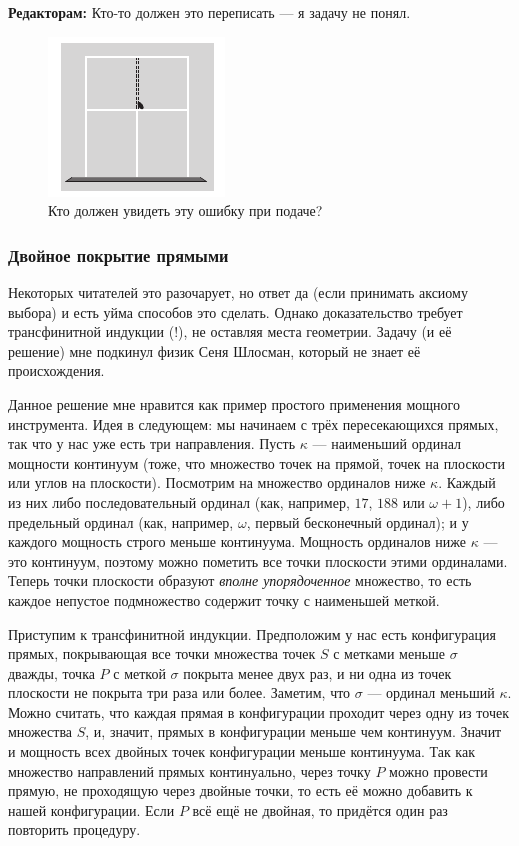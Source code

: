 \begin{addedbytheeditors}
\textbf{Редакторам:} Кто-то должен это переписать --- я задачу не понял.
\end{addedbytheeditors}

\begin{figure}[ht!]
\centering
\includegraphics[scale=1]{pics/tenis}
\caption{Кто должен увидеть эту ошибку при подаче?}
\label{pic:tenis}
\end{figure}

\subsubsection*{Двойное покрытие прямыми}


Некоторых читателей это разочарует, но ответ да (если принимать аксиому выбора) и есть уйма способов это сделать. %
Однако доказательство требует трансфинитной индукции (!), не оставляя места геометрии.
Задачу (и её решение) мне подкинул физик Сеня Шлосман, который не знает её происхождения.

Данное решение мне нравится как пример простого применения мощного инструмента.
Идея в следующем: мы начинаем с трёх пересекающихся прямых, так что у нас уже есть три направления.
Пусть $\kappa$ --- наименьший ординал мощности континуум (тоже, что множество точек на прямой, точек на плоскости или углов на плоскости).
Посмотрим на множество ординалов ниже $\kappa$.
Каждый из них либо последовательный ординал (как, например, $17$, $188$ или $\omega + 1$), либо предельный ординал (как, например, $\omega$, первый бесконечный ординал);
и у каждого мощность строго меньше континуума.
Мощность ординалов ниже $\kappa$ --- это континуум, поэтому можно пометить все точки плоскости этими ординалами. Теперь точки плоскости образуют \emph{вполне упорядоченное} множество, то есть каждое непустое подмножество содержит точку с наименьшей меткой.


Приступим к трансфинитной индукции.
Предположим у нас есть конфигурация прямых, покрывающая все точки множества точек $S$ с метками меньше $\sigma$ дважды,
точка $P$ с меткой $\sigma$ покрыта менее двух раз,
и ни одна из точек плоскости не покрыта три раза или более.
Заметим, что $\sigma$ --- ординал меньший $\kappa$.
Можно считать, что каждая прямая в конфигурации проходит через одну из точек множества $S$, 
и, значит, прямых в конфигурации меньше чем континуум.
Значит и мощность всех двойных точек конфигурации меньше континуума.
Так как множество направлений прямых континуально, через точку $P$ можно провести прямую, не проходящую через двойные точки,
то есть её можно добавить к нашей конфигурации.
Если $P$ всё ещё не двойная, то придётся один раз повторить процедуру.

